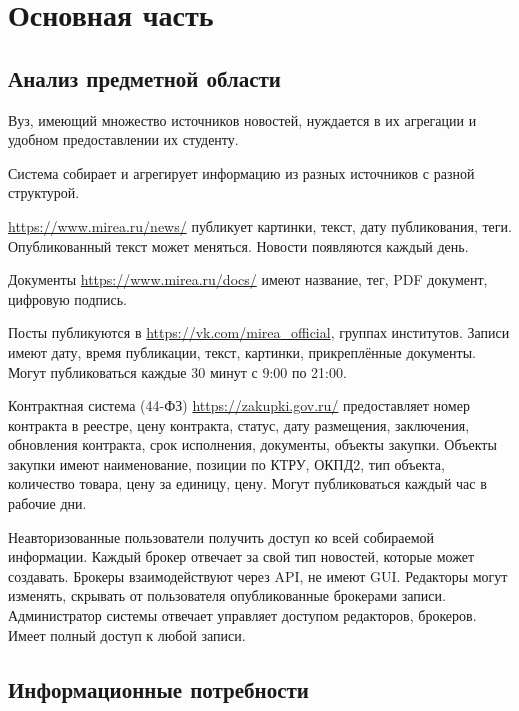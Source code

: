 \documentclass{mirea}
\begin{document}
	

	

	

	
	

	
	
	
	
	
	
	
	\section{Основная часть}
	
	\subsection{Анализ предметной области}
	
	Вуз, имеющий множество источников новостей, нуждается в их агрегации и удобном предоставлении их студенту.
	
	Система собирает и агрегирует информацию из разных источников с разной структурой. 
	
	\url{https://www.mirea.ru/news/} публикует картинки, текст, дату публикования, теги. Опубликованный текст может меняться. Новости появляются каждый день.
	
	Документы \url{https://www.mirea.ru/docs/} имеют название, тег, PDF документ, цифровую подпись.
	
	Посты публикуются в \url{https://vk.com/mirea_official}, группах институтов. Записи имеют дату, время публикации, текст, картинки, прикреплённые документы. Могут публиковаться каждые 30 минут с 9:00 по 21:00. 
	
	Контрактная система (44-ФЗ) \url{https://zakupki.gov.ru/} предоставляет номер контракта в реестре, цену контракта, статус, дату размещения, заключения, обновления контракта, срок исполнения, документы, объекты закупки. Объекты закупки имеют наименование, позиции по КТРУ, ОКПД2, тип объекта, количество товара, цену за единицу, цену. Могут публиковаться каждый час в рабочие дни.
	
	Неавторизованные пользователи получить доступ ко всей собираемой информации. Каждый брокер отвечает за свой тип новостей, которые может создавать. Брокеры взаимодействуют через API, не имеют GUI. Редакторы могут изменять, скрывать от пользователя опубликованные брокерами записи. Администратор системы отвечает управляет доступом редакторов, брокеров. Имеет полный доступ к любой записи.
	
	
	\subsection{Информационные потребности}
	
\end{document}
